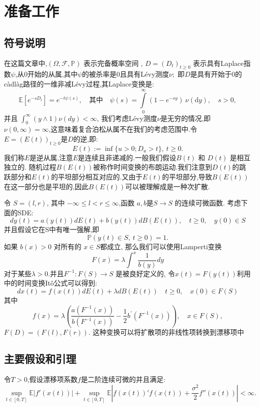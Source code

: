 

\chapter{准备工作}\label{chap:LaTeXEnv}

\section{符号说明}
在这篇文章中,$(\Omega,\mathcal{F},\mathbb{P})$ 表示完备概率空间 , $D=(D_t)_{t\geq0}$ 表示具有Laplace指数$\psi$,从0开始的从属,其中$\psi$的被杀率是0且具有Lévy测度$\nu;$ 即$D$是具有开始于0的càdlàg路径的一维非减Lévy过程,其Laplace变换是:
$$\mathbb{E}[e^{-sD_t}]=e^{-t\psi(s)},\quad\text{其中}\quad\psi(s)=\int\limits_0^\infty(1-e^{-sy})\:\nu(\text{d}y),\quad s>0,$$
并且 $\int_0^\infty(y\wedge1)\nu(dy) < \infty$,
我们考虑Lévy测度$\nu$是无穷的情况,即$\nu ( 0, \infty ) = \infty$,这意味着复合泊松从属不在我们的考虑范围中.令 $E=(E(t))_{t\geq0}$是$D$的逆,即:
$$E(t):=\inf\{u>0;D_u>t\},\:t\geq0.$$
我们称$E$是逆从属,注意$E$是连续且非递减的.一般我们假设$B(t)$ 和 $D(t)$ 是相互独立的. 随机过程$B(E(t))$被称作时间变换的布朗运动.我们注意到$D(t)$的跳跃部分和$E(t)$的平坦部分相互对应的.又由于$E(t)$的平坦部分,导致$B(E(t))$在这一部分也是平坦的,因此$B(E(t))$可以被理解成是一种次扩散.

令 $S=(l,r)$, 其中 $-\infty\leq l<r\leq\infty$,函数 $a,b$是$S\to S$ 的连续可微函数. 考虑下面的SDE:
$$dy(t)=a(y(t))dE(t)+b(y(t))dB(E(t)),\quad t\geq0,\quad y(0)\in S$$
并且假设它在S中有唯一强解,即
$$\mathbb{P}(y(t)\in S,\:t\geq0)=1.$$
如果 $b(x)>0$ 对所有的 $x\in S$都成立, 那么我们可以使用Lamperti变换
\begin{equation}\label{Lamperti}
	F(x)=\lambda\int^x\frac1{b(y)}dy
\end{equation}
对于某些$\lambda>0.$并且$F^{-1}:F(S)\to S$ 是被良好定义的, 令$x(t)=F(y(t))$利用\cite{umarov2018beyond}中的时间变换It\^{o}公式可以得到:
$$dx(t)=f(x(t))dE(t) + \lambda dB(E(t)) \quad t\geq0,\quad x(0)\in F(S)$$
其中
$$f(x)=\lambda\left(\frac{a(F^{-1}(x))}{b(F^{-1}(x))}-\frac12b^{\prime}(F^{-1}(x))\right),\quad x\in F(S),$$
$F(D)=(F(l),F(r)).$ 这种变换可以将扩散项的非线性项转换到漂移项中

\section{主要假设和引理}

\begin{assumption}\label{moment}
	令$T>0$,假设漂移项系数$f$是二阶连续可微的并且满足:
	\begin{equation}
		\sup\limits_{t\in[0,T]}\mathbb{E}\left|f'(x(t))\right|+
		\sup\limits_{t\in[0,T]}\mathbb{E}\left|f(x(t))'f(x(t))+
		\frac{\sigma^2}2f''(x(t))\right|<\infty.
	\end{equation}
\end{assumption}

